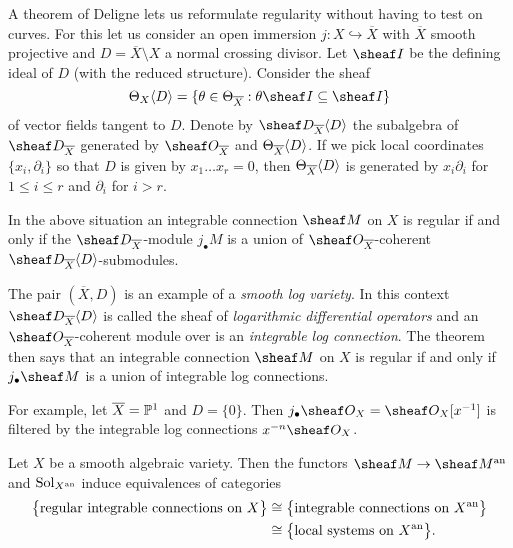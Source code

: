 \documentclass[number-in-sections,a4paper]{notes}
\begin{document}
A theorem of Deligne lets us reformulate regularity without having to test on curves.
For this let us consider an open immersion $j\colon X \hookrightarrow \overline X$ with $\overline X$ smooth projective and $D = \overline X \setminus X$ a normal crossing divisor.
Let $\sheaf I$ be the defining ideal of $D$ (with the reduced structure).
Consider the sheaf
\[
    \tb{X}\langle D \rangle  = \{ \theta \in \tb{\overline X} : \theta \sheaf I \subseteq \sheaf I \}
\]
of vector fields tangent to $D$.
Denote by $\sD_{\overline X}\langle D\rangle$ the subalgebra of $\sD_{\overline X}$ generated by $\sO_{\overline X}$ and $\Theta_{\overline X}\langle D\rangle$.
If we pick local coordinates $\{x_i, \partial_i\}$ so that $D$ is given by $x_1\dotsc x_r = 0$, then $\Theta_{\overline X}\langle D\rangle$ is generated by $x_i\partial_i$ for $1 \le i \le r$ and $\partial_i$ for $i > r$. 

\begin{Theorem}
    In the above situation an integrable connection $\sheaf M$ on $X$ is regular if and only if the $\sD_{\overline X}$-module $j_\bullet M$ is a union of $\sO_{\overline X}$-coherent $\sD_{\overline X}\langle D\rangle$-submodules.
\end{Theorem}

\begin{Remark}
    The pair $(\overline X, D)$ is an example of a \emph{smooth log variety}.
    In this context $\sD_{\overline X}\langle D\rangle$ is called the sheaf of \emph{logarithmic differential operators} and an $\sO_{\overline X}$-coherent module over is an \emph{integrable log connection}.
    The theorem then says that an integrable connection $\sheaf M$ on $X$ is regular if and only if $j_\bullet \sheaf M$ is a union of integrable log connections.

    For example, let $\overline X = \mathbb P^{1}_{}$ and $D = \{0\}$.
    Then $j_\bullet\sO_X = \sO_X[x^{-1}]$ is filtered by the integrable log connections $x^{-n}\sO_X$.
\end{Remark}

\begin{Theorem}\label{thm:Deligne_RH}
    Let $X$ be a smooth algebraic variety.
    Then the functors $\sheaf M \to \sheaf M^\an$ and $\operatorname{Sol}_{X^{\mathrm{an}}}$ induce equivalences of categories
    \begin{align*}
        \bigl\{ \textup{regular integrable connections on $X$}\bigr\}
        & \cong
        \bigl\{ \textup{integrable connections on $X^{\mathrm{an}}$}\bigr\}
        \\&\cong
        \bigl\{ \textup{local systems on $X^{\mathrm{an}}$} \bigr\}.
    \end{align*}
\end{Theorem}
\end{document}
